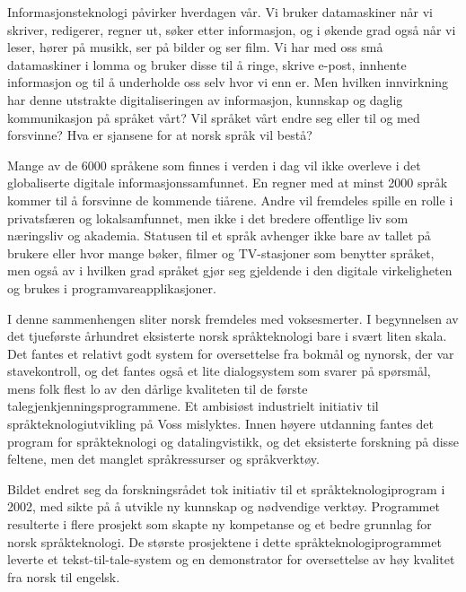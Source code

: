 
\begin{multicols}{2}
Informasjonsteknologi påvirker hverdagen vår. Vi bruker datamaskiner når vi skriver, redigerer, regner ut, søker etter informasjon, og i økende grad også når vi leser, hører på musikk, ser på bilder og ser film. Vi har med oss små datamaskiner i lomma og bruker disse til å ringe, skrive e-post, innhente informasjon og til å underholde oss selv hvor vi enn er. Men hvilken innvirkning har denne utstrakte digitaliseringen av informasjon, kunnskap og daglig kommunikasjon på språket vårt? Vil språket vårt endre seg eller til og med forsvinne? Hva er sjansene for at norsk språk vil bestå?        

Mange av de 6000 språkene som finnes i verden i dag vil ikke overleve i det globaliserte digitale informasjonssamfunnet. En regner med at minst 2000 språk kommer til å forsvinne de kommende tiårene.  Andre vil fremdeles spille en rolle i privatsfæren og lokalsamfunnet, men ikke i det bredere offentlige liv som næringsliv og akademia. Statusen til et språk avhenger ikke bare av tallet på brukere eller hvor mange bøker, filmer og TV-stasjoner som benytter språket, men også av i hvilken grad språket gjør seg gjeldende i den digitale virkeligheten og brukes  i programvareapplikasjoner. 

I denne sammenhengen sliter norsk fremdeles med voksesmerter. I begynnelsen av det tjueførste århundret eksisterte norsk språkteknologi bare i svært liten skala. Det fantes et relativt godt system for oversettelse fra bokmål og nynorsk, der var stavekontroll, og det fantes også et lite dialogsystem som svarer på spørsmål, mens folk flest lo av den dårlige kvaliteten til de første talegjenkjenningsprogrammene. Et ambisiøst industrielt initiativ til språkteknologiutvikling på Voss mislyktes. Innen høyere utdanning fantes det program for språkteknologi og datalingvistikk, og det eksisterte forskning på disse feltene, men det manglet språkressurser og språkverktøy.            

Bildet endret seg da forskningsrådet tok initiativ til et språkteknologiprogram i 2002, med sikte på å utvikle ny kunnskap og nødvendige verktøy. Programmet resulterte i flere prosjekt som skapte ny kompetanse og et bedre grunnlag for norsk språkteknologi. De største prosjektene i dette språkteknologiprogrammet leverte et tekst-til-tale-system og en demonstrator for oversettelse av høy kvalitet fra norsk til engelsk.


\end{multicols}
